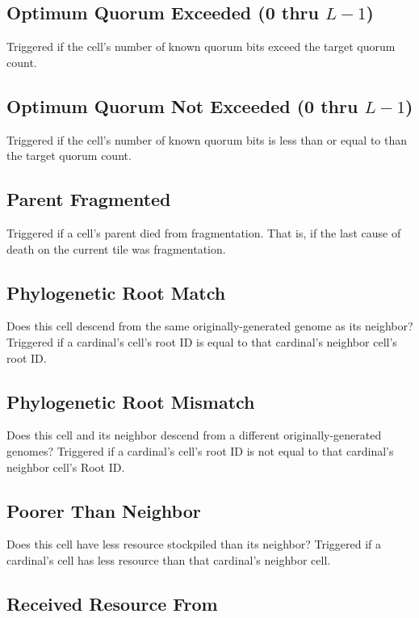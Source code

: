 \subsection{Optimum Quorum Exceeded (0 thru $L-1$)}

Triggered if the cell's number of known quorum bits exceed the target quorum count.

\subsection{Optimum Quorum Not Exceeded (0 thru $L-1$)}

Triggered if the cell's number of known quorum bits is less than or equal to than the target quorum count.

\subsection{Parent Fragmented}

Triggered if a cell's parent died from fragmentation.
That is, if the last cause of death on the current tile was fragmentation.

\subsection{Phylogenetic Root Match}

Does this cell descend from the same originally-generated genome as its neighbor?
Triggered if a cardinal's cell's root ID is equal to that cardinal's neighbor cell's root ID.

\subsection{Phylogenetic Root Mismatch}

Does this cell and its neighbor descend from a different originally-generated genomes?
Triggered if a cardinal's cell's root ID is not equal to that cardinal's neighbor cell's Root ID.

\subsection{Poorer Than Neighbor}

Does this cell have less resource stockpiled than its neighbor?
Triggered if a cardinal's cell has less resource than that cardinal's neighbor cell.

\subsection{Received Resource From}

